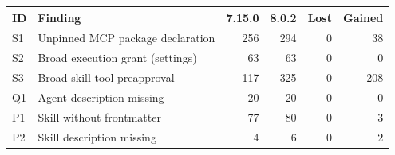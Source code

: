 \begin{tabular}{@{}llrrrr@{}}
\toprule
ID & Finding & 7.15.0 & 8.0.2 & Lost & Gained \\
\midrule
S1 & Unpinned MCP package declaration & 256 & 294 & 0 & 38 \\
S2 & Broad execution grant (settings) & 63 & 63 & 0 & 0 \\
S3 & Broad skill tool preapproval & 117 & 325 & 0 & 208 \\
Q1 & Agent description missing & 20 & 20 & 0 & 0 \\
P1 & Skill without frontmatter & 77 & 80 & 0 & 3 \\
P2 & Skill description missing & 4 & 6 & 0 & 2 \\
\bottomrule
\end{tabular}
